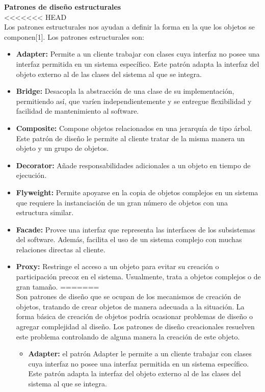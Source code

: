 \documentclass[twoside,twocolumn]{article}
\begin{document}
    \item \textbf{Patrones de diseño estructurales  }
	\\
<<<<<<< HEAD
	\\Los patrones estructurales nos ayudan a definir la forma en la que los objetos se componen[1]. Los patrones estructurales son:
	\begin{itemize}
		\item \textbf{Adapter:}	Permite a un cliente trabajar con clases cuya interfaz no posee una interfaz permitida en un sistema específico. Este patrón adapta la interfaz del objeto externo al de las clases del sistema al que se integra.  
		\item \textbf{Bridge:} Desacopla la abstracción de una clase de su implementación, permitiendo así, que varíen independientemente y se entregue flexibilidad y facilidad de mantenimiento al software.  
		\item \textbf{Composite:} Compone objetos relacionados en una jerarquía de tipo árbol. Este patrón de diseño le permite al cliente tratar de la misma manera un objeto y un grupo de objetos. 
		\item \textbf{Decorator:}	Añade responsabilidades adicionales a un objeto en tiempo de ejecución.  
		\item \textbf{Flyweight:}  Permite apoyarse en la copia de objetos complejos en un sistema que requiere la instanciación de un gran número de objetos con una estructura similar.  
		\item \textbf{Facade:} Provee una interfaz que representa las interfaces de los subsistemas del software. Además, facilita el uso de un sistema complejo con muchas relaciones directas al cliente.  
		\item \textbf{Proxy:} Restringe el acceso a un objeto para evitar su creación o participación precoz en el sistema. Usualmente, trata a objetos complejos o de gran tamaño. 
=======
	\\Son patrones de diseño que se ocupan de los mecanismos de creación de objetos, tratando de crear objetos de manera adecuada a la situación. La forma básica de creación de objetos podría ocasionar problemas de diseño o agregar complejidad al diseño. Los patrones de diseño creacionales resuelven este problema controlando de alguna manera la creación de este objeto.\cite{Tanembaum2}
	\begin{itemize}
		\item \textbf{Adapter:}	el patrón Adapter le permite a un cliente trabajar con clases cuya interfaz no posee una interfaz permitida en un sistema específico. Este patrón adapta la interfaz del objeto externo al de las clases del sistema al que se integra.  

\end{itemize}
\end{itemize}
\end{document}
